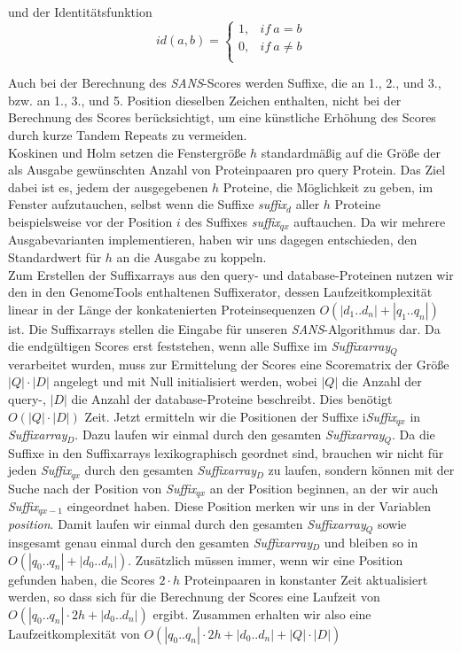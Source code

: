 \documentclass{article}
\begin{document}
und der Identitätsfunktion\\

\begin{equation*}
id(a,b)=\begin{cases}
  1,  & if~a=b\\
  0,  & if~a\ne b\\
\end{cases}
\end{equation*}

Auch bei der Berechnung des \emph{SANS}-Scores werden Suffixe, die an 1., 2., und 3., bzw. an 1., 3., und 5. Position dieselben Zeichen enthalten, nicht bei der Berechnung des Scores berücksichtigt, um eine künstliche Erhöhung des Scores durch kurze Tandem Repeats zu vermeiden.\\
Koskinen und Holm setzen die Fenstergröße $h$ standardmäßig auf die Größe der als
Ausgabe gewünschten Anzahl von Proteinpaaren pro query Protein. 
Das Ziel dabei ist es, jedem der ausgegebenen $h$ Proteine, die Möglichkeit zu
geben, im Fenster aufzutauchen, selbst wenn die Suffixe \emph{suffix$_{d}$}
aller $h$ Proteine beispielsweise vor der Position $i$ des Suffixes
\emph{suffix$_{qx}$} auftauchen. 
Da wir mehrere Ausgabevarianten implementieren, haben wir uns dagegen entschieden, den Standardwert für $h$ an die Ausgabe zu koppeln.\\
Zum Erstellen der Suffixarrays aus den query- und database-Proteinen nutzen wir
den in den GenomeTools enthaltenen Suffixerator, dessen Laufzeitkomplexität
linear in der Länge der konkatenierten Proteinsequenzen $O(|d_1..d_n|+|q_1..q_n|)$ ist.
Die Suffixarrays stellen die Eingabe für unseren  \emph{SANS}-Algorithmus dar.
Da die endgültigen Scores erst feststehen, wenn alle Suffixe im
\emph{Suffixarray$_Q$}
verarbeitet wurden, muss zur Ermittelung der Scores eine Scorematrix der Größe
$|Q|\cdot|D|$ angelegt und mit Null initialisiert werden, wobei $|Q|$ die Anzahl
der query-, $|D|$ die Anzahl der database-Proteine beschreibt. Dies benötigt
$O(|Q|\cdot|D|)$ Zeit. Jetzt ermitteln wir die Positionen der Suffixe
i\emph{Suffix$_{qx}$} in \emph{Suffixarray$_D$}. Dazu laufen wir einmal durch
den gesamten \emph{Suffixarray$_Q$}. Da die Suffixe in den Suffixarrays
lexikographisch geordnet sind, brauchen wir nicht für jeden \emph{Suffix$_{qx}$}
durch den gesamten \emph{Suffixarray$_D$} zu laufen, sondern können mit der
Suche nach der Position von \emph{Suffix$_{qx}$} an der Position beginnen, an
der wir auch \emph{Suffix$_{qx-1}$} eingeordnet haben. Diese Position merken wir
uns in der Variablen \emph{position}. Damit laufen wir einmal durch den gesamten
\emph{Suffixarray$_Q$} sowie insgesamt genau einmal durch den gesamten
\emph{Suffixarray$_D$} und bleiben so in $O(|q_0..q_n| + |d_0..d_n|)$.
Zusätzlich müssen immer, wenn wir eine Position gefunden haben, die Scores $2
\cdot h$ Proteinpaaren in konstanter Zeit aktualisiert werden, so dass sich für
die Berechnung der Scores eine Laufzeit von ${O(|q_0..q_n|\cdot2h +
|d_0..d_n|)}$ ergibt. Zusammen erhalten wir also eine Laufzeitkomplexität von ${O(|q_0..q_n|\cdot2h + |d_0..d_n|+|Q|\cdot|D|)}$
\end{document}
